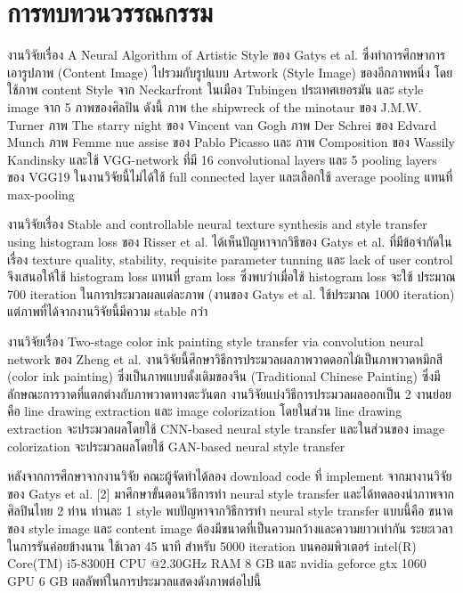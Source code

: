 \documentclass[12pt,oneside,openright,a4paper]{cpe-thai-project}
\begin{document}
\section{การทบทวนวรรณกรรม}
\par\setlength{\parindent}{5ex}
งานวิจัยเรื่อง A Neural Algorithm of Artistic Style ของ Gatys  et al.\cite{gatys2015neural} ซึ่งทำการศึกษาการเอารูปภาพ (Content Image) ไปรวมกับรูปแบบ Artwork (Style Image) ของอีกภาพหนึ่ง โดยใช้ภาพ content Style จาก Neckarfront ในเมือง Tubingen ประเทศเยอรมัน และ style image จาก 5 ภาพของศิลปิน ดังนี้ ภาพ the shipwreck of the minotaur ของ J.M.W. Turner ภาพ The starry night ของ Vincent van Gogh ภาพ Der Schrei ของ Edvard Munch ภาพ Femme nue assise ของ Pablo Picasso และ ภาพ Composition ของ Wassily Kandinsky  และใช้  VGG-network  ที่มี 16 convolutional layers และ 5 pooling layers ของ VGG19 ในงานวิจัยนี้ไม่ได้ใช้ full connected layer และเลือกใช้ average pooling แทนที่ max-pooling 
\par\setlength{\parindent}{5ex}
งานวิจัยเรื่อง Stable and controllable neural texture synthesis and style transfer using histogram loss ของ Risser et al. ได้เห็นปัญหาจากวิธีของ Gatys et al. ที่มีข้อจำกัดในเรื่อง texture quality, stability, requisite parameter tunning และ lack of user control จึงเสนอให้ใช้ histogram loss แทนที่ gram loss ซึ่งพบว่าเมื่อใช้ histogram loss จะใช้ ประมาณ 700 iteration ในการประมวลผลแต่ละภาพ  (งานของ Gatys et al. ใช้ประมาณ 1000 iteration) แต่ภาพที่ได้จากงานวิจัยนี้มีความ stable กว่า 
\par\setlength{\parindent}{5ex}
งานวิจัยเรื่อง Two-stage color ink painting style transfer via convolution neural network ของ Zheng et al.\cite{8636278} งานวิจัยนี้ศึกษาวิธีการประมวลผลภาพวาดดอกไม้เป็นภาพวาดหมึกสี (color ink painting) ซึ่งเป็นภาพแบบดั้งเดิมของจีน (Traditional Chinese Painting) ซึ่งมีลักษณะการวาดที่แตกต่างกับภาพวาดทางตะวันตก งานวิจัยแบ่งวิธีการประมวลผลออกเป็น 2 งานย่อย คือ line drawing extraction และ image colorization โดยในส่วน line drawing extraction จะประมวลผลโดยใช้ CNN-based neural style transfer และในส่วนของ image colorization จะประมวลผลโดยใช้ GAN-based neural style transfer
\par\setlength{\parindent}{5ex} %
หลังจากการศึกษาจากงานวิจัย คณะผู้จัดทำได้ลอง download code ที่ implement จากมางานวิจัยของ Gatys et al. [2] มาศึกษาขั้นตอนวิธีการทำ neural style transfer และได้ทดลองนำภาพจากศิลปินไทย 2 ท่าน ท่านละ 1 style พบปัญหาจากวิธีการทำ neural style transfer แบบนี้คือ ขนาดของ style image และ content image ต้องมีขนาดที่เป็นความกว้างและความยาวเท่ากัน ระยะเวลาในการรันค่อยข้างนาน ใช้เวลา 45 นาที สำหรับ 5000 iteration บนคอมพิวเตอร์ intel(R) Core(TM) i5-8300H CPU @2.30GHz RAM 8 GB และ nvidia geforce gtx 1060 GPU 6 GB ผลลัพท์ในการประมวลแสดงดังภาพต่อไปนี้
\end{document}
